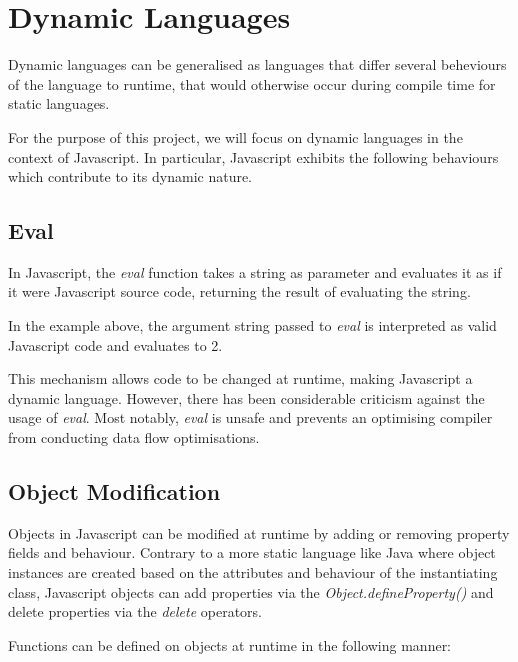 \section{Dynamic Languages}

Dynamic languages can be generalised as languages that differ several beheviours of the language to runtime, that would otherwise occur during compile time for static languages.\parencite{dynProgLang} 

For the purpose of this project, we will focus on dynamic languages in the context of Javascript. In particular, Javascript exhibits the following behaviours which contribute to its dynamic nature.

\subsection{Eval}

In Javascript, the \textit{eval} function takes a string as parameter and evaluates it as if it were Javascript source code, returning the result of evaluating the string. \parencite{eval}



In the example above, the argument string passed to \textit{eval} is interpreted as valid Javascript code and evaluates to 2.

This mechanism allows code to be changed at runtime, making Javascript a dynamic language. However, there has been considerable criticism against the usage of \textit{eval}. Most notably, \textit{eval} is unsafe\parencite{evalSecurity} and prevents an optimising compiler from conducting data flow optimisations.\parencite{neverUseEval}

\subsection{Object Modification}

Objects in Javascript can be modified at runtime by adding or removing property fields and behaviour. Contrary to a more static language like Java where object instances are created based on the attributes and behaviour of the instantiating class, Javascript objects can add properties via the \textit{Object.defineProperty()}\parencite{defineProperty} and delete properties via the \textit{delete}\parencite{delete} operators.

Functions can be defined on objects at runtime in the following manner:

